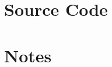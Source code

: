 \documentclass[12pt,oneside,letterpaper,titlepage]{report}
\begin{document}
  

\appendix

\chapter{Source Code}

\newpage

\label{sourceCode}



\chapter{Notes}


\newpage


\end{document}
